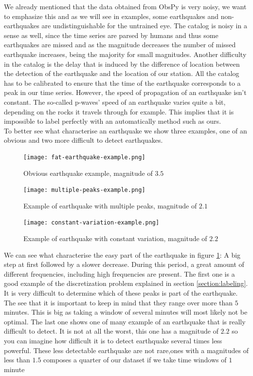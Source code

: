 \documentclass[10pt,conference,compsocconf]{IEEEtran}
\begin{document}
We already mentioned that the data obtained from ObsPy is very noisy, we want to emphasize this and as we will see in examples, some earthquakes and non-earthquakes are undistinguishable for the untrained eye. The catalog is noisy in a sense as well, since the time series are parsed by humans and thus some earthquakes are missed and as the magnitude decreases the number of missed earthquake increases, being the majority for small magnitudes. Another difficulty in the catalog is the delay that is induced by the difference of location between the detection of the earthquake and the location of our station. All the catalog has to be calibrated to ensure that the time of the earthquake corresponds to a peak in our time series. However, the speed of propagation of an earthquake isn't constant. The so-called p-waves' speed of an earthquake varies quite a bit, depending on the rocks it travels through for example. This implies that it is impossible to label perfectly with an automatically method such as ours.\\
To better see what characterise an earthquake we show three examples, one of an obvious and two more difficult to detect earthquakes.

\begin{figure}[h]
  \centering
	\texttt{[image: fat-earthquake-example.png]}
  \caption{Obvious earthquake example, magnitude of $3.5$}
	\label{fig:obvious}
\end{figure}

\begin{figure}[h]
  \centering
	\texttt{[image: multiple-peaks-example.png]}
  \caption{Example of earthquake with multiple peaks, magnitude of $2.1$}
	\label{fig:multiplepeaks}
\end{figure}
\begin{figure}[h]
  \centering
	\texttt{[image: constant-variation-example.png]}
  \caption{Example of earthquake with constant variation, magnitude of $2.2$}
	\label{fig:constanteq}
\end{figure}

We can see what characterise the easy part of the earthquake in figure \ref{fig:obvious}: A big step at first followed by a slower decrease. During this period, a great amount of different frequencies, including high frequencies are present. The first one is a good example of the discretization problem explained in section \ref{section:labeling}. It is very difficult to determine which of these peaks is part of the earthquake. The see that it is important to keep in mind that they range over more than $5$ minutes. This is big as taking a window of several minutes will most likely not be optimal. The last one shows one of many example of an earthquake that is really difficult to detect. It is not at all the worst, this one has a magnitude of $2.2$ so you can imagine how difficult it is to detect earthquake several times less powerful. These less detectable earthquake are not rare,ones with a magnitudes of less than $1.5$ composes a quarter of our dataset if we take time windows of $1$ minute
\end{document}
